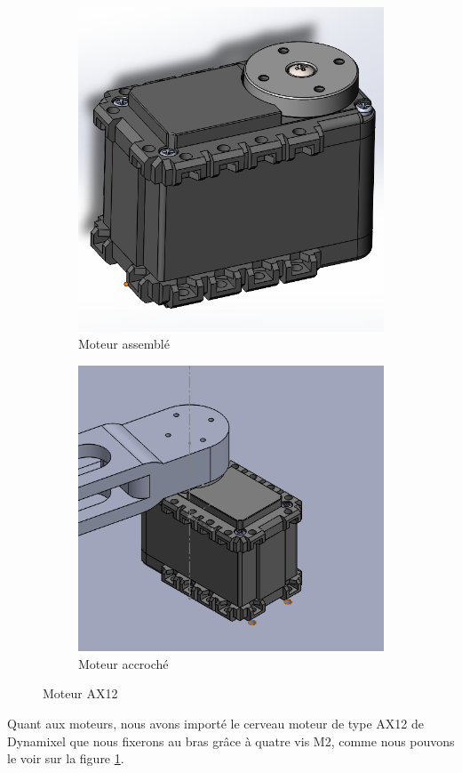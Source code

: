\documentclass[a4paper, 11pt]{report}
\begin{document}
\begin{figure}[!tbh]
    \centering
    \begin{subfigure}[t]{0.45\textwidth}
        \centering
        \includegraphics[width=\textwidth]{Figures/moteur_AX12.png}
        \caption{Moteur assemblé}
    \end{subfigure}
    \hfill
    \begin{subfigure}[t]{0.50\textwidth}
        \centering
        \includegraphics[width=\textwidth]{Figures/moteur_accroche.png}
        \caption{Moteur accroché}
    \end{subfigure}
    \caption{Moteur AX12}
    \label{fig:moteur}
\end{figure}
Quant aux moteurs, nous avons importé le cerveau moteur de type AX12 de Dynamixel que nous fixerons au bras grâce à quatre vis M2, comme nous pouvons le voir sur la figure \ref{fig:moteur}.
\end{document}

